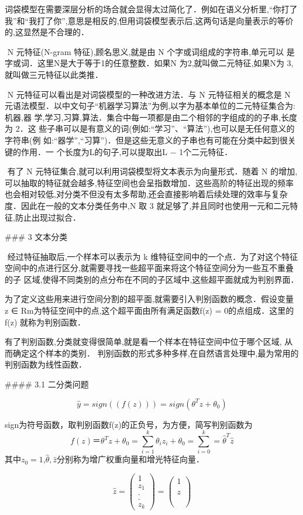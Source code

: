 ​	词袋模型在需要深层分析的场合就会显得太过简化了．例如在语义分析里,“你打了 我”和“我打了你”,意思是相反的,但用词袋模型表示后,这两句话是向量表示的等价 的,这显然是不合理的．

​	N 元特征(N-gram 特征),顾名思义,就是由 N 个字或词组成的字符串,单元可以 是字或词．这里N是大于等于1的任意整数．如果N 为2,就叫做二元特征,如果N为 3,就叫做三元特征以此类推．

​	N 元特征可以看出是对词袋模型的一种改进方法．与 N 元特征相关的概念是 N 元语法模型．以中文句子“机器学习算法”为例,以字为基本单位的二元特征集合为:{机器,器 学,学习,习算,算法}．集合中每一项都是由二个相邻的字组成的的子串,长度为 2．这 些子串可以是有意义的词(例如:“学习”、“算法”),也可以是无任何意义的字符串(例 如:“器学”,“习算”)．但是这些无意义的子串也有可能在分类中起到很关键的作用．一 个长度为L的句子,可以提取出L − 1个二元特征．

​	有了 N 元特征集合,就可以利用词袋模型将文本表示为向量形式．随着 N 的增加, 可以抽取的特征就会越多,特征空间也会呈指数增加．这些高阶的特征出现的频率也会相对较低,对分类不但没有太多帮助,还会直接影响着后续处理的效率与复杂度．因此在一般的文本分类任务中,N 取 3 就足够了,并且同时也使用一元和二元特征,防止出现过拟合．

### 3 文本分类

​	经过特征抽取后,一个样本可以表示为 k 维特征空间中的一个点．为了对这个特征 空间中的点进行区分,就需要寻找一些超平面来将这个特征空间分为一些互不重叠的子 区域,使得不同类别的点分布在不同的子区域中,这些超平面就成为判别界面．

​	为了定义这些用来进行空间分割的超平面,就需要引入判别函数的概念．假设变量 z ∈ Rm为特征空间中的点,这个超平面由所有满足函数f(z) = 0的点组成．这里的f(z) 就称为判别函数．

​	有了判别函数,分类就变得很简单,就是看一个样本在特征空间中位于哪个区域, 从而确定这个样本的类别．  判别函数的形式多种多样,在自然语言处理中,最为常用的判别函数为线性函数．

#### 3.1 二分类问题

$$
\hat y =sign((f(z))) = sign(\theta^Tz+\theta_0)
$$

sign为符号函数，取判别函数f(z)的正负号，为方便，简写判别函数为
$$
f(z) ＝ \theta^Tz+\theta_0 = \sum_{i=1}^{k}\theta_iz_i + \theta_0 = \sum_{i=0}^{k} = \hat \theta^T \hat z
$$
其中$z_0=1$,$\hat\theta,\hat{z}$分别称为增广权重向量和增光特征向量．

$$
\hat z = \left( 
		        \begin{array} {ccc} 1 \\  z_1\\ .\\ .\\  z_k
		        \end{array}
        	    \right) 
                =  \left( 
        	    \begin{array}{ccc}
		        1 \\ \\ z \\ \\  \\  
		        \end{array}
        	    \right)
$$

